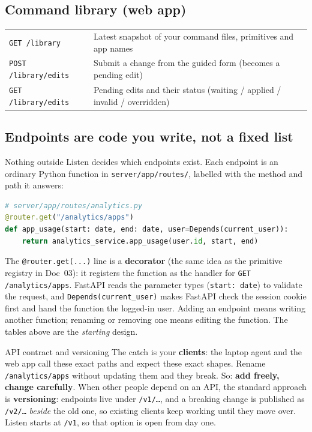 \documentclass[11pt,a4paper]{article}
\begin{document}
\subsection{Command library (web app)}
\begin{center}
\renewcommand{\arraystretch}{1.15}
\begin{tabularx}{\textwidth}{l X}
\toprule
\texttt{GET  /library}       & Latest snapshot of your command files, primitives and app names \\
\texttt{POST /library/edits} & Submit a change from the guided form (becomes a pending edit) \\
\texttt{GET  /library/edits} & Pending edits and their status (waiting / applied / invalid / overridden) \\
\bottomrule
\end{tabularx}
\end{center}

\subsection{Endpoints are code you write, not a fixed list}
Nothing outside Listen decides which endpoints exist. Each endpoint is an ordinary Python
function in \texttt{server/app/routes/}, labelled with the method and path it answers:

\begin{lstlisting}[language=Python]
# server/app/routes/analytics.py
@router.get("/analytics/apps")
def app_usage(start: date, end: date, user=Depends(current_user)):
    return analytics_service.app_usage(user.id, start, end)
\end{lstlisting}

\noindent The \texttt{@router.get(...)} line is a \textbf{decorator} (the same idea as the
primitive registry in Doc~03): it registers the function as the handler for
\texttt{GET /analytics/apps}. FastAPI reads the parameter types (\texttt{start: date}) to validate
the request, and \texttt{Depends(current\_user)} makes FastAPI check the session cookie first and
hand the function the logged-in user. Adding an endpoint means writing another function;
renaming or removing one means editing the function. The tables above are the
\emph{starting} design.

\begin{concept}{API contract and versioning}
The catch is your \textbf{clients}: the laptop agent and the web app call these exact paths and
expect these exact shapes. Rename \texttt{/analytics/apps} without updating them and they break.
So: \textbf{add freely, change carefully}. When other people depend on an API, the standard
approach is \textbf{versioning}: endpoints live under \texttt{/v1/\ldots}, and a breaking change
is published as \texttt{/v2/\ldots} \emph{beside} the old one, so existing clients keep working
until they move over. Listen starts at \texttt{/v1}, so that option is open from day one.
\end{concept}
\end{document}
